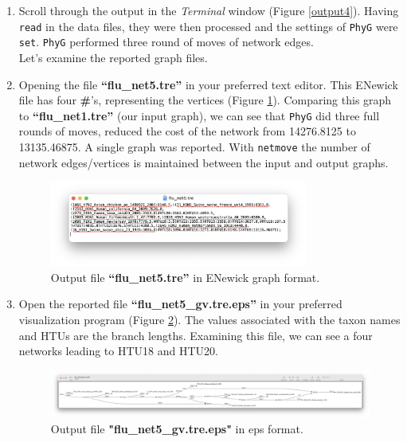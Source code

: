 \documentclass[11pt]{article}
\newcommand{\phyg}{\texttt{PhyG} }
\begin{document}
\begin {enumerate}
\item Scroll through the output in the \textit{Terminal} window (Figure \ref{output4}). 
Having \texttt{read} in the data files, they were then processed and the settings of 
\phyg were \texttt{set}. \phyg performed three round of moves of network edges.\\

Let's examine the reported graph files. 

\item Opening the file \textbf{``flu\_net5.tre''} in your preferred text editor. This 
ENewick file has four \textbf{\#}'s, representing the vertices (Figure 
\ref{tre5}). Comparing this graph to \textbf{``flu\_net1.tre''} (our input graph), we can 
see that \phyg did three full rounds of moves, reduced the cost of the network from 
14276.8125 to 13135.46875. A single graph was reported. With \texttt{netmove}
the number of network edges/vertices is maintained between the input and output 
graphs.

\begin{figure}[H]
\centering
\includegraphics[width=0.8\textwidth]{tre5.png}
\caption{Output file \textbf{``flu\_net5.tre''} in ENewick graph format.}
\label{tre5}
\end{figure}

\item  Open the reported file \textbf{``flu\_net5\_gv.tre.eps''} in your preferred
visualization program (Figure \ref{eps5}). The values associated with the taxon 
names and HTUs are the branch lengths. Examining this file, we can see a four
networks leading to HTU18 and HTU20.

\begin{figure}[H]
\centering
\includegraphics[width=\textwidth]{eps5.png}
\caption{Output file \textbf{"flu\_net5\_gv.tre.eps"} in eps format.}
\label{eps5}
\end{figure}


\end{enumerate}
\end{document}
